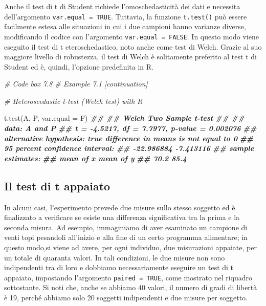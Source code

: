 \documentclass[
  12pt,
]{book}
\newenvironment{Shaded}{\begin{snugshade}}{\end{snugshade}}
\newcommand{\AttributeTok}[1]{\textcolor[rgb]{0.77,0.63,0.00}{#1}}
\newcommand{\CommentTok}[1]{\textcolor[rgb]{0.56,0.35,0.01}{\textit{#1}}}
\newcommand{\DocumentationTok}[1]{\textcolor[rgb]{0.56,0.35,0.01}{\textbf{\textit{#1}}}}
\newcommand{\FunctionTok}[1]{\textcolor[rgb]{0.00,0.00,0.00}{#1}}
\newcommand{\NormalTok}[1]{#1}
\begin{document}
Anche il test di t di Student richiede l'omoschedasticità dei dati e necessita dell'argomento \texttt{var.equal\ =\ TRUE}. Tuttavia, la funzione \texttt{t.test()} può essere facilmente estesa alle situazioni in cui i due campioni hanno varianze diverse, modificando il codice con l'argomento \texttt{var.equal\ =\ FALSE}. In questo modo viene eseguito il test di t eteroschedastico, noto anche come test di Welch. Grazie al suo maggiore livello di robustezza, il test di Welch è solitamente preferito al test t di Student ed è, quindi, l'opzione predefinita in R.

\vspace{12pt}

\begin{Shaded}
\begin{Highlighting}[]
\CommentTok{\# Code box 7.8}
\CommentTok{\# Example 7.1 [continuation]}

\CommentTok{\# Heteroscedastic t{-}test (Welch test) with R}

\FunctionTok{t.test}\NormalTok{(A, P, }\AttributeTok{var.equal =}\NormalTok{ F)}
\DocumentationTok{\#\# }
\DocumentationTok{\#\#  Welch Two Sample t{-}test}
\DocumentationTok{\#\# }
\DocumentationTok{\#\# data:  A and P}
\DocumentationTok{\#\# t = {-}4.5217, df = 7.7977, p{-}value = 0.002076}
\DocumentationTok{\#\# alternative hypothesis: true difference in means is not equal to 0}
\DocumentationTok{\#\# 95 percent confidence interval:}
\DocumentationTok{\#\#  {-}22.986884  {-}7.413116}
\DocumentationTok{\#\# sample estimates:}
\DocumentationTok{\#\# mean of x mean of y }
\DocumentationTok{\#\#      70.2      85.4}
\end{Highlighting}
\end{Shaded}

\hypertarget{il-test-di-t-appaiato}{%
\subsection{Il test di t appaiato}\label{il-test-di-t-appaiato}}

In alcuni casi, l'esperimento prevede due misure sullo stesso soggetto ed è finalizzato a verificare se esiste una differenza significativa tra la prima e la seconda misura. Ad esempio, immaginiamo di aver esaminato un campione di venti topi pesandoli all'inizio e alla fine di un certo programma alimentare; in questo modo,si viene ad avere, per ogni individuo, due misurazioni appaiate, per un totale di quaranta valori. In tali condizioni, le due misure non sono indipendenti tra di loro e dobbiamo necessariamente eseguire un test di t appaiato, impostando l'argomento \texttt{paired\ =\ TRUE}, come mostrato nel riquadro sottostante. Si noti che, anche se abbiamo 40 valori, il numero di gradi di libertà è 19, perché abbiamo solo 20 soggetti indipendenti e due misure per soggetto.
\end{document}
